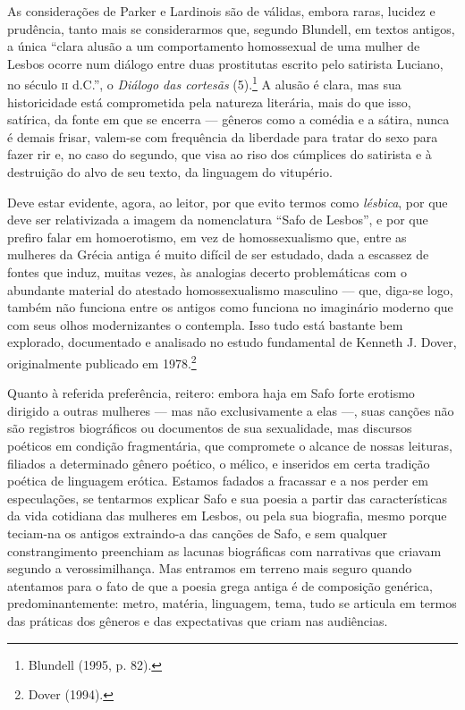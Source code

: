 As considerações de Parker e Lardinois são de válidas, embora raras, lucidez e
prudência, tanto mais se considerarmos que, segundo Blundell, em
textos antigos, a única “clara alusão a um comportamento homossexual de uma
mulher de Lesbos ocorre num diálogo entre duas prostitutas escrito pelo
satirista Luciano, no século \textsc{ii} d.C.”, o \textit{Diálogo das cortesãs}
(5).\footnote{ Blundell (1995, p. 82).} A
alusão é clara, mas sua historicidade está comprometida pela natureza
literária, mais do que isso, satírica, da fonte em que se encerra --- gêneros como a
comédia e a sátira, nunca é demais frisar, valem-se com frequência da liberdade
para tratar do sexo para fazer rir e, no caso do segundo, que visa ao riso dos
cúmplices do satirista e à destruição do alvo de seu texto, da linguagem do
vitupério. 

Deve estar evidente, agora, ao leitor, por que evito termos como
\textit{lésbica}, por que deve ser relativizada a imagem da nomenclatura “Safo
de Lesbos”, e por que prefiro falar em homoerotismo, em vez de homossexualismo
que, entre as mulheres da Grécia antiga é muito difícil de ser estudado, dada a
escassez de fontes que induz, muitas vezes, às analogias decerto problemáticas
com o abundante material do atestado homossexualismo masculino --- que,
diga-se logo, também não funciona entre os antigos como funciona no imaginário
moderno que com seus olhos modernizantes o contempla. Isso tudo está bastante
bem explorado, documentado e analisado no estudo fundamental de Kenneth J.
Dover, originalmente publicado em 1978.\footnote{ Dover (1994).}

Quanto à referida preferência, reitero: embora haja em Safo forte erotismo
dirigido a outras mulheres --- mas não exclusivamente a elas ---, suas canções não
são registros biográficos ou documentos de sua sexualidade, mas discursos
poéticos em condição fragmentária, que compromete o alcance de nossas leituras,
filiados a determinado gênero poético, o mélico, e inseridos em certa tradição
poética de linguagem erótica. Estamos fadados a fracassar e a nos perder em
especulações, se tentarmos explicar Safo e sua poesia a partir das
características da vida cotidiana das mulheres em Lesbos, ou pela sua
biografia, mesmo porque teciam-na os antigos extraindo-a das canções de Safo, e
sem qualquer constrangimento preenchiam as lacunas biográficas com narrativas
que criavam segundo a verossimilhança. Mas entramos em terreno mais seguro
quando atentamos para o fato de que a poesia grega antiga é de composição
genérica, predominantemente: metro, matéria, linguagem, tema, tudo se articula
em termos das práticas dos gêneros e das expectativas que criam nas audiências.

